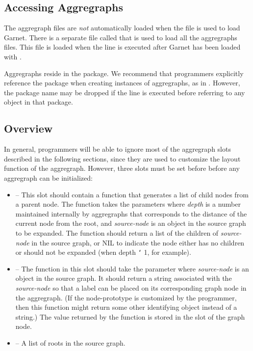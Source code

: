 \subsection{Accessing Aggregraphs}

The aggregraph files are {\it not} automatically loaded when the file
 is used to load Garnet.  There is a separate file
called  that is used to load all the aggregraphs
files.  This file is loaded when the line
is executed after Garnet has been loaded with .

Aggregraphs reside in the  package.  We recommend that programmers
explicitly reference the  package when creating instances of
aggregraphs, as in .  However, the package name may be
dropped if the line
is executed before referring to any object in that package.


\subsection{Overview}

In general, programmers will be able to ignore most of the aggregraph slots
described in the following sections, since they are used to customize the
layout function of the aggregraph.  However, three slots must be set before
before any aggregraph can be initialized:

\begin{itemize}
\item {} -- This slot should contain a function that generates
a list of child nodes from a parent node.  The function takes the parameters
where {\it depth} is a number maintained internally by aggregraphs that
corresponds to the distance of the current node from the root,
and {\it source-node} is an
object in the source graph to be expanded.  The function should return a list
of the children of {\it source-node} in the source graph, or NIL to indicate the
node either has no children or should not be expanded (when depth {\tt\char`\>} 1, for
example).

\item {} -- The function in this slot should take the parameter
where {\it source-node} is an object in the source graph.  It should return a
string associated with the {\it source-node} so that a label can be placed on
its corresponding graph node in the aggregraph.  (If the node-prototype is
customized by the programmer, then this function might return some other
identifying object instead of a string.)  The value returned by the function
is stored in the  slot of the graph node.

\item {} -- A list of roots in the source graph.
\end{itemize}


